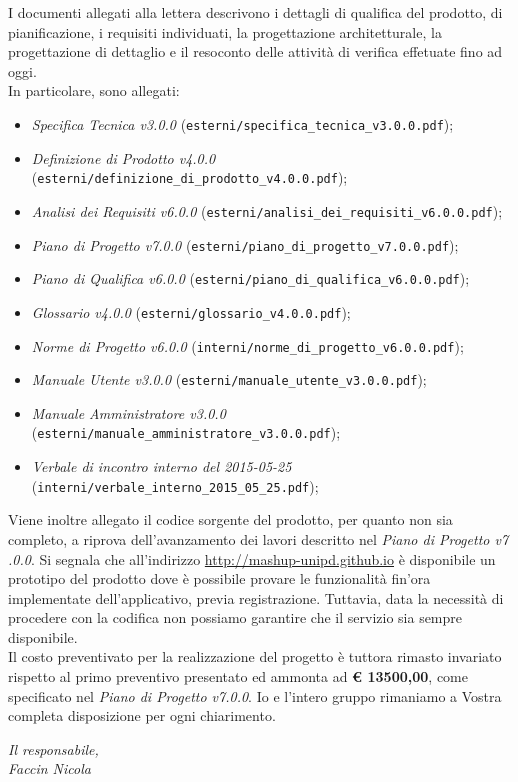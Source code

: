 \documentclass[10pt,a4paper,sans]{moderncv}        %
\begin{document}
\vfill
I documenti allegati alla lettera descrivono i dettagli di qualifica del prodotto, di pianificazione, i requisiti individuati, la progettazione architetturale, la progettazione di dettaglio e il resoconto delle attività di verifica effetuate fino ad oggi.\\
\vfill
In particolare, sono allegati:
	\begin{itemize}
		\item \textit{Specifica Tecnica v3.0.0} ({\verb!esterni/specifica_tecnica_v3.0.0.pdf!});
		\item \textit{Definizione di Prodotto v4.0.0} ({\verb!esterni/definizione_di_prodotto_v4.0.0.pdf!});
		\item \textit{Analisi dei Requisiti v6.0.0} ({\verb!esterni/analisi_dei_requisiti_v6.0.0.pdf!});
		\item \textit{Piano di Progetto v7.0.0} ({\verb!esterni/piano_di_progetto_v7.0.0.pdf!});
		\item \textit{Piano di Qualifica v6.0.0} ({\verb!esterni/piano_di_qualifica_v6.0.0.pdf!});
		\item \textit{Glossario v4.0.0} ({\verb!esterni/glossario_v4.0.0.pdf!});
		\item \textit{Norme di Progetto v6.0.0} ({\verb!interni/norme_di_progetto_v6.0.0.pdf!});
		\item \textit{Manuale Utente v3.0.0} ({\verb!esterni/manuale_utente_v3.0.0.pdf!});
		\item \textit{Manuale Amministratore v3.0.0} ({\verb!esterni/manuale_amministratore_v3.0.0.pdf!});
		\item \textit{Verbale di incontro interno del 2015-05-25} ({\verb!interni/verbale_interno_2015_05_25.pdf!});
	\end{itemize}
\noindent
Viene inoltre allegato il codice sorgente del prodotto, per quanto non sia completo, a riprova dell'avanzamento dei lavori descritto nel \textit{Piano di Progetto v7	.0.0}. Si segnala che all'indirizzo {\color{blue}\url{http://mashup-unipd.github.io}} è disponibile un prototipo del prodotto dove è possibile provare le funzionalità fin'ora implementate dell'applicativo, previa registrazione. Tuttavia, data la necessità di procedere con la codifica non possiamo garantire che il servizio sia sempre disponibile.\\
\vfill
Il costo preventivato per la realizzazione del progetto è tuttora rimasto invariato rispetto al primo preventivo presentato ed ammonta ad \textbf{\euro{} 13500,00}, come specificato nel \textit{Piano di Progetto v7.0.0}. \newline Io e l'intero gruppo rimaniamo a Vostra completa disposizione per ogni chiarimento.
	\begin{flushright}
		\textit{Il responsabile,}\\
		\textit{Faccin Nicola}
	\end{flushright}
\end{document}
